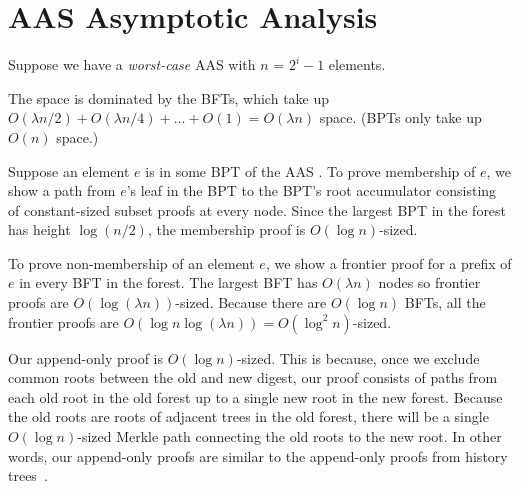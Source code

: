 \section{AAS Asymptotic Analysis}
\label{s:aas:asymptotics}
Suppose we have a \textit{worst-case} AAS with $n$ = $2^i - 1$ elements.

The space is dominated by the BFTs, which take up $O(\lambda n/2) + O(\lambda n/4) + \dots + O(1) = O(\lambda n)$ space.
(BPTs only take up $O(n)$ space.)

Suppose an element $e$ is in some BPT of the AAS .
To prove membership of $e$, we show a path from $e$'s leaf in the BPT to the BPT's root accumulator consisting of constant-sized subset proofs at every node.
Since the largest BPT in the forest has height $\log{(n/2)}$, the membership proof is $O(\log{n})$-sized.

To prove non-membership of an element $e$, we show a frontier proof for a prefix of $e$ in every BFT in the forest.
The largest BFT has $O(\lambda n)$ nodes so frontier proofs are $O(\log{(\lambda n)})$-sized.
Because there are $O(\log{n})$ BFTs, all the frontier proofs are $O(\log{n}\log{(\lambda n)}) = O(\log^2{n})$-sized.

Our append-only proof is $O(\log{n})$-sized.
This is because, once we exclude common roots between the old and new digest, our proof consists of paths from each old root in the old forest up to a single new root in the new forest.
Because the old roots are roots of adjacent trees in the old forest, there will be a single $O(\log{n})$-sized Merkle path connecting the old roots to the new root.
In other words, our append-only proofs are similar to the append-only proofs from history trees~\cite{ht}.